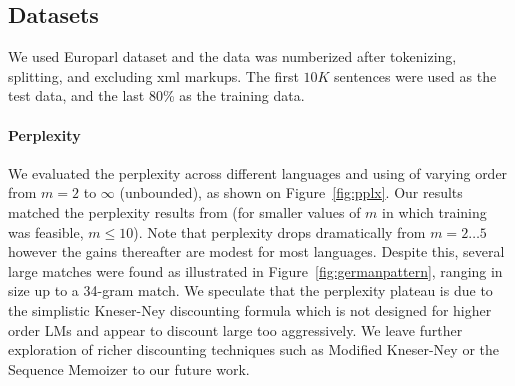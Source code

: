 
\subsection{Datasets}
We used Europarl dataset and the data was numberized after tokenizing, splitting, and excluding xml markups. The first $10K$ sentences were used as the test data, and the last 80\% as the training data. %


\paragraph{Perplexity}
We evaluated the perplexity across different languages and using \ngrams of varying order from $m=2$ to $\infty$ (unbounded), as shown on Figure~\ref{fig:pplx}.
Our results matched the perplexity results from \SRILM (for smaller values of $m$ in which \SRILM training was feasible, $m \le 10$).
Note that perplexity drops dramatically from $m=2\ldots5$ however the gains thereafter are modest for most languages.
Despite this, several large \ngram matches were found as illustrated in Figure~\ref{fig:germanpattern}, ranging in size up to a 34-gram match.
We speculate that the perplexity plateau is due to the simplistic Kneser-Ney discounting formula which is not designed for higher order \ngram LMs and appear to discount large \ngrams too aggressively. 
We leave further exploration of richer discounting techniques such as Modified Kneser-Ney \cite{chen_goodman} or the Sequence Memoizer \cite{wood_teh} to our future work.


